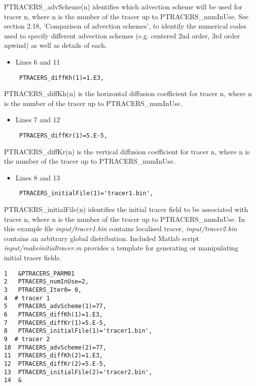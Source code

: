 \noindent PTRACERS\_advScheme(n) identifies which advection scheme
will be used for tracer n, where n is the number of the tracer up to
PTRACERS\_numInUse. See section 2.18, 'Comparison of advection
schemes', to identify the numerical codes used to specify different
advection schemes (e.g. centered 2nd order, 3rd order upwind) as well
as details of each.
 
\begin{itemize}
\item Lines 6 and 11
\begin{verbatim}
 PTRACERS_diffKh(1)=1.E3,
\end{verbatim}
\end{itemize}

\noindent PTRACERS\_diffKh(n) is the horizontal diffusion coefficient
for tracer n, where n is the number of the tracer up to
PTRACERS\_numInUse.

\begin {itemize}
\item Lines 7 and 12
\begin{verbatim}
 PTRACERS_diffKr(1)=5.E-5,
\end{verbatim}
\end{itemize}

\noindent PTRACERS\_diffKr(n) is the vertical diffusion coefficient
for tracer n, where n is the number of the tracer up to
PTRACERS\_numInUse.

\begin {itemize}
\item Lines 8 and 13
\begin{verbatim}
 PTRACERS_initialFile(1)='tracer1.bin',
\end{verbatim}
\end{itemize}

\noindent PTRACERS\_initialFile(n) identifies the initial tracer field
to be associated with tracer n, where n is the number of the tracer up
to PTRACERS\_numInUse. In this example file {\it input/tracer1.bin}
contains localised tracer, {\it input/tracer2.bin} contains an
arbitrary global distribution. Included Matlab script {\it
  input/makeinitialtracer.m} provides a template for generating or
manipulating initial tracer fields.

\begin {verbatim}
1   &PTRACERS_PARM01
2   PTRACERS_numInUse=2,
3   PTRACERS_Iter0= 0,
4  # tracer 1 
5   PTRACERS_advScheme(1)=77,
6   PTRACERS_diffKh(1)=1.E3,
7   PTRACERS_diffKr(1)=5.E-5,
8   PTRACERS_initialFile(1)='tracer1.bin',
9  # tracer 2 
10  PTRACERS_advScheme(2)=77,
11  PTRACERS_diffKh(2)=1.E3,
12  PTRACERS_diffKr(2)=5.E-5,
13  PTRACERS_initialFile(2)='tracer2.bin',
14  &
\end{verbatim}

